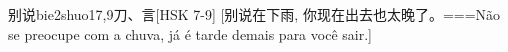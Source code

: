 \begin{EntryWithPhonetic}{别说}{bie2shuo1}{7,9}{⼑、⾔}[HSK 7-9]
  [别说在下雨, 你现在出去也太晚了。===Não se preocupe com a chuva, já é tarde demais para você sair.]
\end{EntryWithPhonetic}
